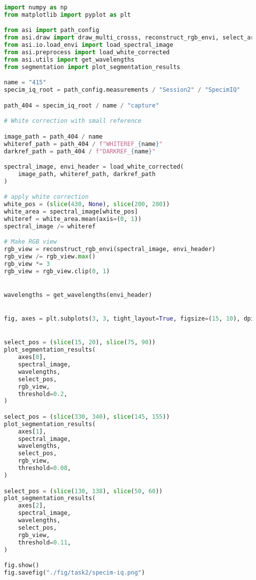 \begin{lstlisting}[language=python, caption=Segmentation of leaves by Specim IQ, label={code:leaves-specim-iq}]
import numpy as np
from matplotlib import pyplot as plt

from asi import path_config
from asi.draw import draw_multi_crosss, reconstruct_rgb_envi, select_area
from asi.io.load_envi import load_spectral_image
from asi.preprocess import load_white_corrected
from asi.utils import get_wavelengths
from segmentation import plot_segmentation_results

name = "415"
specim_iq_root = path_config.measurements / "Session2" / "SpecimIQ"

path_404 = specim_iq_root / name / "capture"

# White correction with small reference

image_path = path_404 / name
whiteref_path = path_404 / f"WHITEREF_{name}"
darkref_path = path_404 / f"DARKREF_{name}"

spectral_image, envi_header = load_white_corrected(
    image_path, whiteref_path, darkref_path
)

# apply white correction
white_pos = (slice(430, None), slice(200, 280))
white_area = spectral_image[white_pos]
whiteref = white_area.mean(axis=(0, 1))
spectral_image /= whiteref

# Make RGB view
rgb_view = reconstruct_rgb_envi(spectral_image, envi_header)
rgb_view /= rgb_view.max()
rgb_view *= 3
rgb_view = rgb_view.clip(0, 1)


wavelengths = get_wavelengths(envi_header)


fig, axes = plt.subplots(3, 3, tight_layout=True, figsize=(15, 10), dpi=80)


select_pos = (slice(15, 20), slice(75, 90))
plot_segmentation_results(
    axes[0],
    spectral_image,
    wavelengths,
    select_pos,
    rgb_view,
    threshold=0.2,
)

select_pos = (slice(330, 340), slice(145, 155))
plot_segmentation_results(
    axes[1],
    spectral_image,
    wavelengths,
    select_pos,
    rgb_view,
    threshold=0.08,
)

select_pos = (slice(130, 138), slice(50, 60))
plot_segmentation_results(
    axes[2],
    spectral_image,
    wavelengths,
    select_pos,
    rgb_view,
    threshold=0.11,
)

fig.show()
fig.savefig("./fig/task2/specim-iq.png")
\end{lstlisting}
